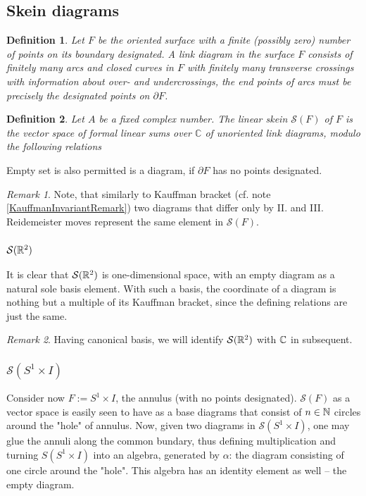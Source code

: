 \documentclass[10pt]{article} %
\newtheorem{definition}{Definition}[section]
\theoremstyle{remark}
\newtheorem{remark}{Remark}
\renewcommand{\S}{\mathcal{S}}
\begin{document}
\subsection{Skein diagrams}
\begin{definition}
	Let $F$ be the oriented surface with a finite (possibly zero) number of points on its boundary designated. A \textit{link diagram} in the 
	surface $F$ consists of finitely many arcs and closed curves in $F$ with finitely many transverse crossings with information about
	over- and undercrossings, the end points of arcs must be precisely the designated points on $\partial F$.
\end{definition}
\begin{definition}
	Let $A$ be a fixed complex number. The linear skein $\mathcal{S}(F)$ of $F$ is the vector space of formal linear sums over $\mathbb{C}$
	of unoriented link diagrams, modulo the following relations
\end{definition}
Empty set is also permitted is a diagram, if $\partial F$ has no points designated.
\begin{remark}
	Note, that similarly to Kauffman bracket (cf. note \ref{KauffmanInvariantRemark}) two diagrams that differ only by II.
	and III. Reidemeister moves represent the same element in $\S(F)$.\end{remark}
\subsubsection{$\S(\R^2)$}
It is clear that $\S(\R^2)$ is one-dimensional space, with an empty diagram as a natural sole basis element. With such a basis, the coordinate
of a diagram is nothing but a multiple of its Kauffman bracket, since the defining relations are just the same. 
\begin{remark}Having canonical basis, we will
	identify $\S(\R^2)$ with $\mathbb{C}$ in subsequent.\end{remark}
\subsubsection{$\S(S^1\times I)$}
Consider now $F:=S^1\times I$, the annulus (with no points designated). $\S(F)$ as a vector space is easily seen to have as a base
diagrams that consist of $n\in\mathbb{N}$ circles around the "hole" of annulus.
Now, given two diagrams in $\S(S^1\times I)$, one may glue the annuli along the common bundary,
thus defining multiplication and turning $S(S^1\times I)$
into an algebra, generated by $\alpha$: the diagram consisting of one circle around the "hole".
This algebra has an identity element as well -- the empty diagram.
\end{document}
